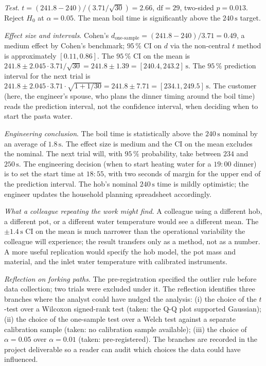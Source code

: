 \begin{project}
\smallskip
\textit{Test}. $t = (241.8 - 240)/(3.71/\sqrt{30}) = 2.66$,
$\text{df} = 29$, two-sided $p = 0.013$. Reject $H_{0}$ at
$\alpha = 0.05$. The mean boil time is significantly above the
$240\,\si{\second}$ target.

\smallskip
\textit{Effect size and intervals}.
Cohen's $d_{\text{one-sample}} = (241.8 - 240)/3.71 = 0.49$, a
medium effect by Cohen's benchmark; $95 \,\%$ CI on $d$ via the
non-central $t$ method is approximately $[0.11, 0.86]$. The
$95 \,\%$ CI on the mean is $241.8 \pm 2.045 \cdot 3.71/\sqrt{30}
= 241.8 \pm 1.39 = [240.4, 243.2]\,\si{\second}$. The $95 \,\%$
prediction interval for the next trial is $241.8 \pm 2.045 \cdot
3.71 \cdot \sqrt{1 + 1/30} = 241.8 \pm 7.71 = [234.1, 249.5]\,
\si{\second}$. The customer (here, the engineer's spouse, who
plans the dinner timing around the boil time) reads the
prediction interval, not the confidence interval, when deciding
when to start the pasta water.

\smallskip
\textit{Engineering conclusion}. The boil time is statistically
above the $240\,\si{\second}$ nominal by an average of $1.8\,
\si{\second}$. The effect size is medium and the CI on the mean
excludes the nominal. The next trial will, with $95 \,\%$
probability, take between $234$ and $250\,\si{\second}$. The
engineering decision (when to start heating water for a
$19{:}00$ dinner) is to set the start time at $18{:}55$, with
two seconds of margin for the upper end of the prediction
interval. The hob's nominal $240\,\si{\second}$ time is mildly
optimistic; the engineer updates the household planning
spreadsheet accordingly.

\smallskip
\textit{What a colleague repeating the work might find}. A
colleague using a different hob, a different pot, or a
different water temperature would see a different mean. The
$\pm 1.4\,\si{\second}$ CI on the mean is much narrower than
the operational variability the colleague will experience; the
result transfers only as a method, not as a number. A more
useful replication would specify the hob model, the pot mass
and material, and the inlet water temperature with calibrated
instruments.

\smallskip
\textit{Reflection on forking paths}. The pre-registration
specified the outlier rule before data collection; two trials
were excluded under it. The reflection identifies three
branches where the analyst could have nudged the analysis: (i)
the choice of the $t$-test over a Wilcoxon signed-rank test
(taken: the Q-Q plot supported Gaussian); (ii) the choice of
the one-sample test over a Welch test against a separate
calibration sample (taken: no calibration sample available);
(iii) the choice of $\alpha = 0.05$ over $\alpha = 0.01$
(taken: pre-registered). The branches are recorded in the
project deliverable so a reader can audit which choices the
data could have influenced.


\end{project}
